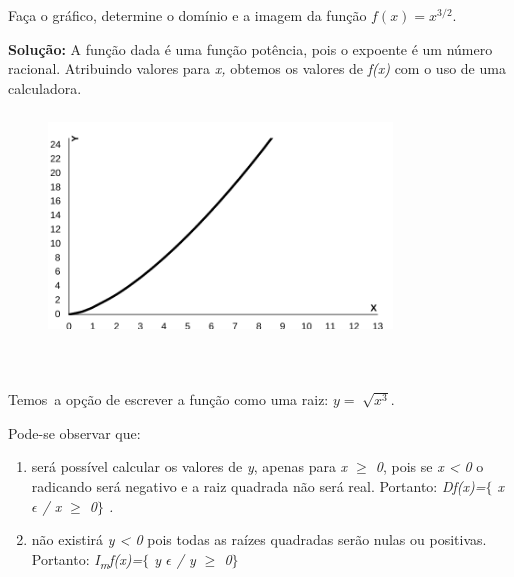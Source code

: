\begin{texemplo}
	
Faça o gráfico, determine o domínio e a imagem da função  \( f \left( x \right) =x^{3/2} \).

\textbf{Solução:} A função dada é uma função potência, pois o expoente é um número racional. Atribuindo valores para \textit{x,} obtemos os valores de \textit{f(x)} com o uso de uma calculadora. 

\begin{figure}[H]
	\begin{Center}
		\includegraphics[width=3.59in,height=2.35in]{capitulos/outras_funcoes/media/image3.pdf}
	\end{Center}
\end{figure}

~~

\quad Temos~a opção de escrever a função como uma raiz:   \( y=\sqrt[]{x^{3}} \).

Pode-se observar que: 

\begin{enumerate}
	\item será possível calcular os valores de \textit{y}, apenas para  \textit{x $ \geq $  0}, pois se \textit{x < 0} o radicando será negativo e a raiz quadrada não será real. Portanto: \textit{Df(x)=$ \{ $  x $ \epsilon $ / x $ \geq $  0$ \} $ .}

	\item não existirá \textit{y < 0} pois todas as raízes quadradas serão nulas ou positivas. Portanto: \textit{I\textsubscript{m}f(x)=$ \{ $ y $ \epsilon $   / y $ \geq $  0$ \} $  }\qedsymbol{} 
\end{enumerate}
\end{texemplo}

